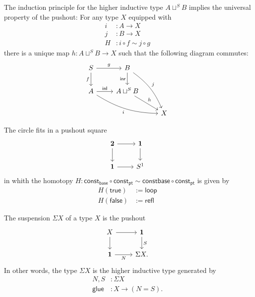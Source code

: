 \documentclass[handout]{beamer}
\newcommand{\unit}{\mathbf{1}}
\newcommand{\sphere}[1]{S^{#1}}
\newcommand{\htpy}{\sim}
\newcommand{\refl}{\mathsf{refl}}
\newcommand{\baseS}{\mathsf{base}}
\newcommand{\loopS}{\mathsf{loop}}
\newcommand{\const}{\mathsf{const}}
\newcommand{\btrue}{\mathsf{true}}
\newcommand{\bfalse}{\mathsf{false}}
\newcommand{\ttt}{\mathsf{pt}}
\newcommand{\inl}{\mathsf{inl}}
\newcommand{\inr}{\mathsf{inr}}
\newcommand{\glue}{\mathsf{glue}}
\begin{document}
\begin{frame}
  The induction principle for the higher inductive type $A\sqcup^S B$ implies the universal property of the pushout: For any type $X$ equipped with
  \begin{align*}
    i & : A \to X \\
    j & : B \to X \\
    H & : i\circ f \sim j\circ g
  \end{align*}
  there is a unique map $h:A\sqcup^S B\to X$ such that the following diagram commutes:
  \begin{equation*}
    \begin{tikzcd}[ampersand replacement=\&]
      S \arrow[d,swap,"f"] \arrow[r,"g"] \& B \arrow[d,swap,"\inr"] \arrow[ddr,bend left=15,"j"] \\
      A \arrow[r,"\inl"] \arrow[drr,bend right=15,swap,"i"] \& A \sqcup^S B \arrow[dr,"h"] \\
      \& \& X
    \end{tikzcd}
  \end{equation*}
\end{frame}

\begin{frame}
  \begin{example}
    The circle fits in a pushout square
    \begin{equation*}
      \begin{tikzcd}[ampersand replacement=\&]
        \mathbf{2} \arrow[r] \arrow[d] \& \mathbf{1} \arrow[d] \\
        \mathbf{1} \arrow[r] \& \sphere{1}
      \end{tikzcd}
    \end{equation*}
    in whith the homotopy $H:\const_\baseS\circ\const_\ttt\htpy\const\baseS\circ\const_\ttt$ is given by
    \begin{align*}
      H(\btrue) & := \loopS \\
      H(\bfalse) & := \refl
    \end{align*}    
  \end{example}
\end{frame}

\begin{frame}
  \begin{example}
    The suspension $\Sigma X$ of a type $X$ is the pushout
    \begin{equation*}
      \begin{tikzcd}[ampersand replacement=\&]
        X \arrow[r] \arrow[d] \& \unit \arrow[d,"S"] \\
        \unit \arrow[r,swap,"N"] \& \Sigma X.
      \end{tikzcd}
    \end{equation*}
    In other words, the type $\Sigma X$ is the higher inductive type generated by
    \begin{align*}
      N,S & : \Sigma X \\
      \glue & : X\to (N=S).
    \end{align*}
  \end{example}
\end{frame}
\end{document}
